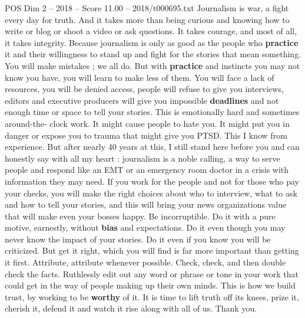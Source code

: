 \begin{textsample}{POS Dim 2 – 2018 – Score 11.00 – 2018/t000695.txt}
Journalism is war, a fight every day for truth.
And it takes more than being curious and knowing how to write or blog or shoot a video or ask questions.
It takes courage, and most of all, it takes integrity.
Because journalism is only as good as the people who \textbf{practice} it and their willingness to stand up and fight for the stories that mean something.
You will make mistakes ; we all do.
But with \textbf{practice} and instincts you may not know you have, you will learn to make less of them.
You will face a lack of resources, you will be denied access, people will refuse to give you interviews, editors and executive producers will give you impossible \textbf{deadlines} and not enough time or space to tell your stories.
This is emotionally hard and sometimes around-the- clock work.
It might cause people to hate you.
It might put you in danger or expose you to trauma that might give you PTSD.
This I know from experience.
But after nearly 40 years at this, I still stand here before you and can honestly say with all my heart : journalism is a noble calling, a way to serve people and respond like an EMT or an emergency room doctor in a crisis with information they may need.
If you work for the people and not for those who pay your checks, you will make the right choices about who to interview, what to ask and how to tell your stories, and this will bring your news organizations value that will make even your bosses happy.
Be incorruptible.
Do it with a pure motive, earnestly, without \textbf{bias} and expectations.
Do it even though you may never know the impact of your stories.
Do it even if you know you will be criticized.
But get it right, which you will find is far more important than getting it first.
Attribute, attribute whenever possible.
Check, check, and then double check the facts.
Ruthlessly edit out any word or phrase or tone in your work that could get in the way of people making up their own minds.
This is how we build trust, by working to be \textbf{worthy} of it.
It is time to lift truth off its knees, prize it, cherish it, defend it and watch it rise along with all of us.
Thank you.

\end{textsample}
